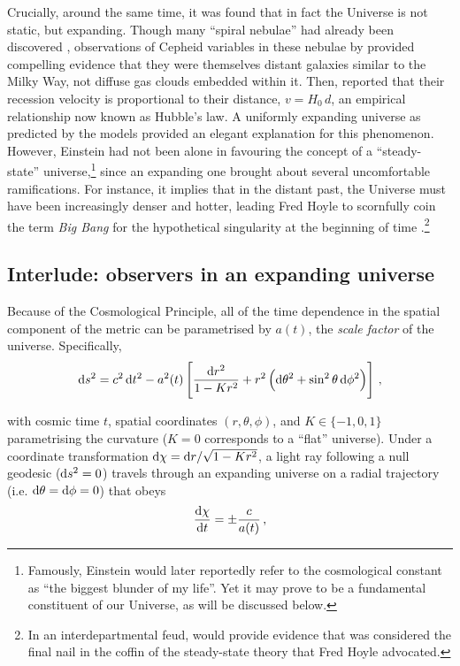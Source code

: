 Crucially, around the same time, it was found that in fact the Universe is not static, but expanding. Though many ``spiral nebulae'' had already been discovered \citep[e.g.][]{964AlSufi}, observations of Cepheid variables in these nebulae by \citet{1925ApJ....62..409H, 1926ApJ....63..236H} provided compelling evidence that they were themselves distant galaxies similar to the Milky Way, not diffuse gas clouds embedded within it. Then, \citet{1929PNAS...15..168H} reported that their recession velocity is proportional to their distance, $v = H_0 \, d$, an empirical relationship now known as Hubble's law. A uniformly expanding universe as predicted by the \citeauthor{1922ZPhy...10..377F} models provided an elegant explanation for this phenomenon. However, Einstein had not been alone in favouring the concept of a ``steady-state'' universe,\footnote{Famously, Einstein would later reportedly refer to the cosmological constant as ``the biggest blunder of my life''. Yet it may prove to be a fundamental constituent of our Universe, as will be discussed below.} since an expanding one brought about several uncomfortable ramifications. For instance, it implies that in the distant past, the Universe must have been increasingly denser and hotter, leading Fred Hoyle to scornfully coin the term \textit{Big Bang} for the hypothetical singularity at the beginning of time \citep[already discussed by][]{1927PhDT.........6L}.\footnote{In an interdepartmental feud, \citet{1961MNRAS.122..349R} would provide evidence that was considered the final nail in the coffin of the steady-state theory that Fred Hoyle advocated.}

\subsection{Interlude: observers in an expanding universe}
\label{chIssec:Observers_in_an_expanding_universe}

Because of the Cosmological Principle, all of the time dependence in the spatial component of the metric can be parametrised by $a(t)$, the \textit{scale factor} of the universe. Specifically,
\begin{equation}
    \label{chIeq:FLRW_metric}
    \dif s^2 = c^2 \dif t^2 - a^2(t) \left[ \frac{\dif r^2}{1 - Kr^2} + r^2 \left( \dif \theta^2 + \sin^2 \theta \dif \phi^2 \right) \right] \, ,
\end{equation}

\noindent with cosmic time $t$, spatial coordinates $(r, \theta, \phi)$, and $K \in \{ -1, 0, 1 \}$ parametrising the curvature ($K = 0$ corresponds to a ``flat'' universe). Under a coordinate transformation $\dif \chi = \dif r / \sqrt{1 - Kr^2}$, a light ray following a null geodesic ($\dif s^2 = 0$) travels through an expanding universe on a radial trajectory (i.e. $\dif \theta = \dif \phi = 0$) that obeys
\begin{equation}
    \label{chIeq:Null_geodesic}
    \frac{\dif \chi}{\dif t} = \pm \frac{c}{a(t)} \, ,
\end{equation}

